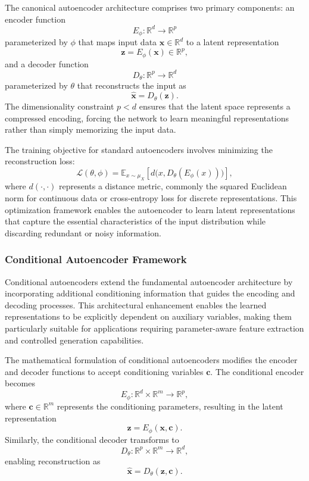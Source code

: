 \documentclass[12pt,a4paper]{report}
\begin{document}
The canonical autoencoder architecture comprises two primary components: an encoder function 
\[
E_{\phi}: \mathbb{R}^{d} \rightarrow \mathbb{R}^{p}
\]
parameterized by $\phi$ that maps input data $\mathbf{x} \in \mathbb{R}^{d}$ to a latent representation 
\[
\mathbf{z} = E_{\phi}(\mathbf{x}) \in \mathbb{R}^{p},
\]
and a decoder function
\[
D_{\theta}: \mathbb{R}^{p} \rightarrow \mathbb{R}^{d}
\]
parameterized by $\theta$ that reconstructs the input as 
\[
\hat{\mathbf{x}} = D_{\theta}(\mathbf{z}).
\]
The dimensionality constraint $p < d$ ensures that the latent space represents a compressed encoding, forcing the network to learn meaningful representations rather than simply memorizing the input data.

The training objective for standard autoencoders involves minimizing the reconstruction loss:
\[
\mathcal{L}(\theta, \phi) = \mathbb{E}_{x \sim \mu_{X}} \left[d\big(x, D_{\theta}(E_{\phi}(x))\big)\right],
\]
where $d(\cdot, \cdot)$ represents a distance metric, commonly the squared Euclidean norm for continuous data or cross-entropy loss for discrete representations. This optimization framework enables the autoencoder to learn latent representations that capture the essential characteristics of the input distribution while discarding redundant or noisy information.

\subsubsection*{Conditional Autoencoder Framework}

Conditional autoencoders extend the fundamental autoencoder architecture by incorporating additional conditioning information that guides the encoding and decoding processes. This architectural enhancement enables the learned representations to be explicitly dependent on auxiliary variables, making them particularly suitable for applications requiring parameter-aware feature extraction and controlled generation capabilities.

The mathematical formulation of conditional autoencoders modifies the encoder and decoder functions to accept conditioning variables $\mathbf{c}$. The conditional encoder becomes
\[
E_{\phi}: \mathbb{R}^{d} \times \mathbb{R}^{m} \rightarrow \mathbb{R}^{p},
\]
where $\mathbf{c} \in \mathbb{R}^{m}$ represents the conditioning parameters, resulting in the latent representation
\[
\mathbf{z} = E_{\phi}(\mathbf{x}, \mathbf{c}).
\]
Similarly, the conditional decoder transforms to
\[
D_{\theta}: \mathbb{R}^{p} \times \mathbb{R}^{m} \rightarrow \mathbb{R}^{d},
\]
enabling reconstruction as
\[
\hat{\mathbf{x}} = D_{\theta}(\mathbf{z}, \mathbf{c}).
\]
\end{document}
